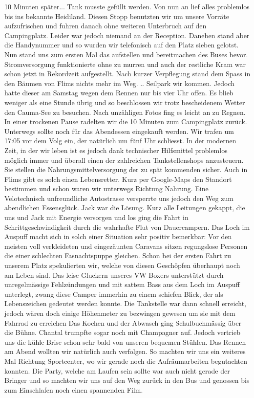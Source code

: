 10 Minuten später...
Tank musste gefüllt werden.
Von nun an lief alles problemlos bis ins bekannte Heidiland.
Diesen Stopp benutzten wir um unsere Vorräte aufzufrischen und fuhren danach ohne weiteren Unterbruch auf den Campingplatz.
Leider war jedoch niemand an der Reception.
Daneben stand aber die Handynummer und so wurden wir telefonisch auf den Platz sieben gelotst.
Nun stand uns zum ersten Mal das aufstellen und bereitmachen des Buses bevor.
Stromversorgung funktionierte ohne zu murren und
auch der restliche Kram war schon jetzt in Rekordzeit aufgestellt.
Nach kurzer Verpflegung stand dem Spass in den Bäumen von Flims nichts mehr im Weg.
.. Seilpark wir kommen.
Jedoch hatte dieser am Samstag wegen dem Rennen nur bis vier Uhr offen.
Es blieb weniger als eine Stunde übrig und so beschlossen wir trotz bescheidenem Wetter den Cauma-See zu besuchen.
Nach unzähligen Fotos fing es leicht an zu Regnen.
In einer trockenen Pause radelten wir die 10 Minuten zum Campingplatz zurück.
Unterwegs sollte noch für das Abendessen eingekauft werden.
Wir trafen um 17:05 vor dem Volg ein, der natürlich um fünf Uhr schliesst.
In der modernen Zeit, in der wir leben ist es jedoch dank technischer Hilfsmittel problemlos möglich immer und überall einen der zahlreichen Tankstellenshops anzusteuern.
Sie stellen die Nahrungsmittelversorgung der zu spät kommenden sicher.
Auch in Flims gibt es solch einen Lebensretter.
Kurz per Google-Maps den Standort bestimmen und schon waren wir unterwegs Richtung Nahrung.
Eine Velotechnisch unfreundliche Autostrasse versperrte uns jedoch den Weg zum abendlichen Essensglück.
Jack war die Lösung.
Kurz alle Leitungen gekappt, die uns und Jack mit Energie versorgen und los ging die Fahrt in Schrittgeschwindigkeit durch die wahrhafte Flut von Dauercampern.
Das Loch im Auspuff macht sich in solch einer Situation sehr positiv bemerkbar: Vor den meisten voll verkleideten und eingezäunten Caravans sitzen regungslose Personen die einer schlechten Fasnachtspuppe gleichen.
Schon bei der ersten Fahrt zu unserem Platz spekulierten wir, welche von diesen Geschöpfen überhaupt noch am Leben sind.
Das leise Gluckern unseres VW Boxers unterstützt durch unregelmässige Fehlzündungen und mit sattem Bass aus dem Loch im Auspuff unterlegt, zwang diese Camper immerhin zu einem schiefen Blick, der als Lebenszeichen gedeutet werden konnte.
Die Tankstelle war dann schnell erreicht, jedoch wären doch einige Höhenmeter zu bezwingen gewesen um sie mit dem Fahrrad zu erreichen Das Kochen und der Abwasch ging Schulbuchmässig über die Bühne.
Chantal trumpfte sogar noch mit Champagner auf.
Jedoch vertrieb uns die kühle Brise schon sehr bald von unseren bequemen Stühlen.
Das Rennen am Abend wollten wir natürlich auch verfolgen.
So machten wir uns ein weiteres Mal Richtung Sportcenter, wo wir gerade noch die Aufräumarbeiten begutachten konnten.
Die Party, welche am Laufen sein sollte war auch nicht gerade der Bringer und so machten wir uns auf den Weg zurück in den Bus und genossen bis zum Einschlafen noch einen spannenden Film.

